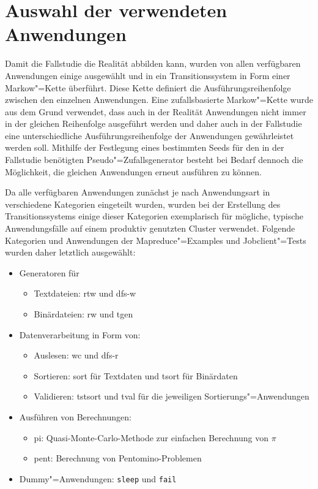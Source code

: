 \section{Auswahl der verwendeten Anwendungen}\label{sec:appSelection}

Damit die Fallstudie die Realität abbilden kann, wurden von allen verfügbaren Anwendungen einige ausgewählt und in ein Transitionssystem in Form einer Markow"=Kette überführt. Diese Kette definiert die Ausführungsreihenfolge zwischen den einzelnen Anwendungen. Eine zufallsbasierte Markow"=Kette wurde aus dem Grund verwendet, dass auch in der Realität Anwendungen nicht immer in der gleichen Reihenfolge ausgeführt werden und daher auch in der Fallstudie eine unterschiedliche Ausführungsreihenfolge der Anwendungen gewährleistet werden soll. Mithilfe der Festlegung eines bestimmten Seeds für den in der Fallstudie benötigten Pseudo"=Zufallsgenerator besteht bei Bedarf dennoch die Möglichkeit, die gleichen Anwendungen erneut ausführen zu können.

Da alle verfügbaren Anwendungen zunächst je nach Anwendungsart in verschiedene Kategorien eingeteilt wurden, wurden bei der Erstellung des Transitionssystems einige dieser Kategorien exemplarisch für mögliche, typische Anwendungsfälle auf einem produktiv genutzten Cluster verwendet. Folgende Kategorien und Anwendungen der Mapreduce"=Examples und Jobclient"=Tests wurden daher letztlich ausgewählt:

\begin{itemize}
    \item Generatoren für
    \begin{itemize}
        \item Textdateien: \ac{rtw} und \ac{dfs-w}
        \item Binärdateien: \ac{rw} und \ac{tgen}
    \end{itemize}

    \item Datenverarbeitung in Form von:
    \begin{itemize}
        \item Auslesen: \ac{wc} und \ac{dfs-r}
        \item Sortieren: \acl{sort} für Textdaten und \ac{tsort} für Binärdaten
        \item Validieren: \ac{tstsort} und \ac{tval} für die jeweiligen Sortierungs"=Anwendungen
    \end{itemize}

    \item Ausführen von Berechnungen:
    \begin{itemize}
        \item \acl{pi}: Quasi-Monte-Carlo-Methode zur einfachen Berechnung von $\pi$ 
        \item \ac{pent}: Berechnung von Pentomino-Problemen
    \end{itemize}

    \item Dummy"=Anwendungen: \texttt{sleep} und \texttt{fail}
\end{itemize}

